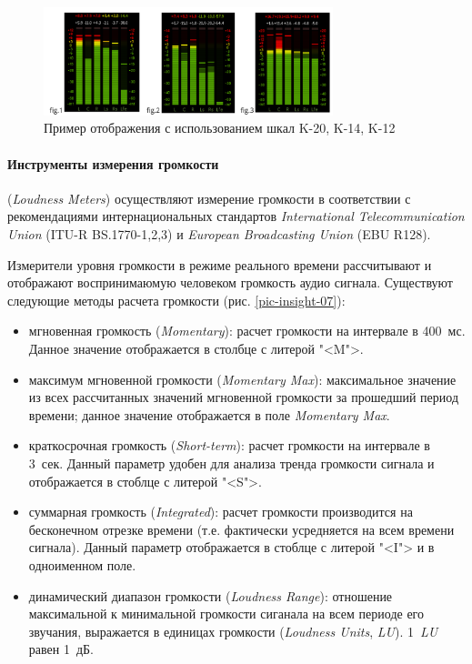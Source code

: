 \documentclass[oneside, final, 14pt]{extreport}
\begin{document}
\begin{figure}[h!]
\centering
\includegraphics[width=0.75\textwidth]{pic-insight-06}
\caption{Пример отображения с использованием шкал K-20, K-14, K-12}
\label{pic-insight-06}
\end{figure}

\paragraph{Инструменты измерения громкости} (\textit{Loudness Meters}) осуществляют измерение громкости в соответствии с рекомендациями интернациональных стандартов \textit{International Telecommunication Union} (ITU-R BS.1770-1,2,3) и \textit{European Broadcasting Union} (EBU R128). 

Измерители уровня громкости в режиме реального времени рассчитывают и отображают воспринимаюмую человеком громкость аудио сигнала. Существуют следующие методы расчета громкости (рис. \ref{pic-insight-07}):
\begin{itemize}
\item мгновенная громкость (\textit{Momentary}): расчет громкости на интервале в 400~мс. Данное значение отображается в столбце с литерой "<M">. 
\item максимум мгновенной громкости (\textit{Momentary Max}): максимальное значение из всех рассчитанных значений мгновенной громкости за прошедший период времени; данное значение отображается в поле \textit{Momentary Max}. 
\item краткосрочная громкость (\textit{Short-term}): расчет громкости на интервале в 3~сек.  Данный параметр удобен для анализа тренда громкости сигнала и отображается в стоблце с литерой "<S">.
\item суммарная громкость (\textit{Integrated}): расчет громкости производится на бесконечном отрезке времени (т.е. фактически усредняется на всем времени сигнала). Данный параметр отображается в стоблце с литерой "<I"> и в одноименном поле.
\item динамический диапазон громкости (\textit{Loudness Range}): отношение максимальной к минимальной громкости сиганала на всем периоде его звучания, выражается в единицах громкости (\textit{Loudness Units}, \textit{LU}). 1~\textit{LU} равен 1~дБ.
\end{itemize}
\end{document}
